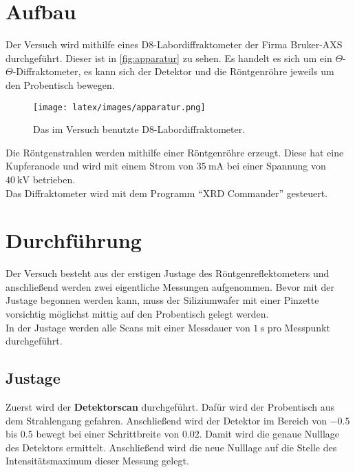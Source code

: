 \section{Aufbau}

    \noindent Der Versuch wird mithilfe eines D8-Labordiffraktometer der Firma Bruker-AXS durchgeführt. Dieser ist in \autoref{fig:apparatur}
    zu sehen. Es handelt es sich um ein $\Theta$-$\Theta$-Diffraktometer, es kann sich der Detektor und die Röntgenröhre jeweils um den 
    Probentisch bewegen. 
    \begin{figure}
        \centering
        \texttt{[image: latex/images/apparatur.png]}
        \caption{Das im Versuch benutzte D8-Labordiffraktometer. }
        \label{fig:apparatur}
    \end{figure}
    Die Röntgenstrahlen werden mithilfe einer Röntgenröhre erzeugt. Diese hat eine Kupferanode und wird mit einem Strom von $\SI{35}{\milli\ampere}$ 
    bei einer Spannung von $\SI{40}{\kilo\volt}$ betrieben. \\
    Das Diffraktometer wird mit dem Programm \enquote{XRD Commander} gesteuert. 

\section{Durchführung}

    \noindent 
    Der Versuch besteht aus der erstigen Justage des Röntgenreflektometers und anschließend werden zwei eigentliche Messungen aufgenommen.
    Bevor mit der Justage begonnen werden kann, muss der Siliziumwafer mit einer Pinzette vorsichtig möglichst mittig auf den Probentisch gelegt werden. \\
    In der Justage werden alle Scans mit einer Messdauer von $\SI{1}{\second}$ pro Messpunkt durchgeführt.


    \subsection{Justage}

        \noindent Zuerst wird der \textbf{Detektorscan} durchgeführt. Dafür wird der Probentisch aus dem Strahlengang gefahren. Anschließend 
        wird der Detektor im Bereich von $\num{-0.5}$ bis $\num{0.5}$ bewegt bei einer Schrittbreite von $\num{0.02} $. 
        Damit wird die genaue Nulllage des Detektors ermittelt. Anschließend wird die neue Nulllage auf die Stelle des Intensitätsmaximum 
        dieser Messung gelegt. \\

